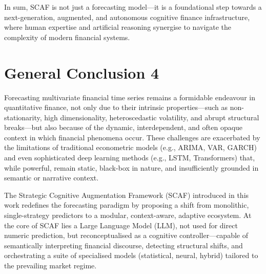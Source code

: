 \documentclass[conference]{IEEEtran}
\begin{document}
In sum, SCAF is not just a forecasting model—it is a foundational step towards a next-generation, augmented, and autonomous cognitive finance infrastructure, where human expertise and artificial reasoning synergise to navigate the complexity of modern financial systems.

\section{General Conclusion 4}

Forecasting multivariate financial time series remains a formidable endeavour in quantitative finance, not only due to their intrinsic properties—such as non-stationarity, high dimensionality, heteroscedastic volatility, and abrupt structural breaks—but also because of the dynamic, interdependent, and often opaque context in which financial phenomena occur. These challenges are exacerbated by the limitations of traditional econometric models (e.g., ARIMA, VAR, GARCH) and even sophisticated deep learning methods (e.g., LSTM, Transformers) that, while powerful, remain static, black-box in nature, and insufficiently grounded in semantic or narrative context.

The Strategic Cognitive Augmentation Framework (SCAF) introduced in this work redefines the forecasting paradigm by proposing a shift from monolithic, single-strategy predictors to a modular, context-aware, adaptive ecosystem. At the core of SCAF lies a Large Language Model (LLM), not used for direct numeric prediction, but reconceptualised as a cognitive controller—capable of semantically interpreting financial discourse, detecting structural shifts, and orchestrating a suite of specialised models (statistical, neural, hybrid) tailored to the prevailing market regime.
\end{document}
